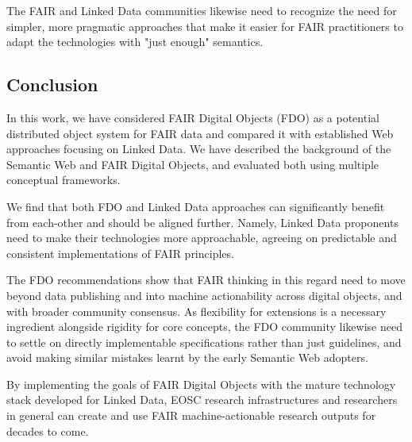 The FAIR and Linked Data communities likewise need to recognize the need for simpler, more pragmatic approaches that make it easier for FAIR practitioners to adapt the technologies with "just enough" semantics. 



\subsection{Conclusion}\label{ch3:conclusion}

In this work, we have considered FAIR Digital Objects (FDO) as a potential distributed object system for FAIR data and compared it with established Web approaches focusing on Linked Data. We have described the background of the Semantic Web and FAIR Digital Objects, and evaluated both using multiple conceptual frameworks.

We find that both FDO and Linked Data approaches can significantly benefit from each-other and should be aligned further. Namely, Linked Data proponents need to make their technologies more approachable, agreeing on predictable and consistent implementations of FAIR principles. 

The FDO recommendations show that FAIR thinking in this regard need to move beyond data publishing and into machine actionability across digital objects, and with broader community consensus. 
As flexibility for extensions is a necessary ingredient alongside rigidity for core concepts, the FDO community likewise need to settle on directly implementable specifications rather than just guidelines, and avoid making similar mistakes learnt by the early Semantic Web adopters. 

By implementing the goals of FAIR Digital Objects with the mature technology stack developed for Linked Data, EOSC research infrastructures and researchers in general can create and use FAIR machine-actionable research outputs for decades to come.

